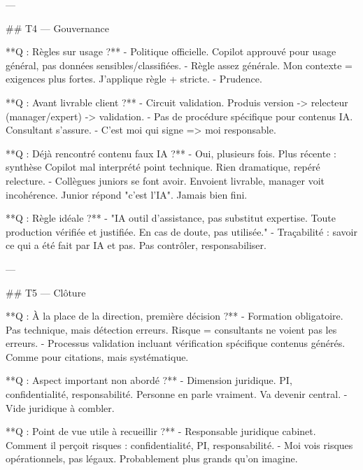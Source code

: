 ---

## T4 — Gouvernance

**Q : Règles sur usage ?**
- Politique officielle. Copilot approuvé pour usage général, pas données sensibles/classifiées.
- Règle assez générale. Mon contexte = exigences plus fortes. J'applique règle + stricte.
- Prudence.

**Q : Avant livrable client ?**
- Circuit validation. Produis version -> relecteur (manager/expert) -> validation.
- Pas de procédure spécifique pour contenus IA. Consultant s'assure.
- C'est moi qui signe => moi responsable.

**Q : Déjà rencontré contenu faux IA ?**
- Oui, plusieurs fois. Plus récente : synthèse Copilot mal interprété point technique. Rien dramatique, repéré relecture.
- Collègues juniors se font avoir. Envoient livrable, manager voit incohérence. Junior répond "c'est l'IA". Jamais bien fini.

**Q : Règle idéale ?**
- "IA outil d'assistance, pas substitut expertise. Toute production vérifiée et justifiée. En cas de doute, pas utilisée."
- Traçabilité : savoir ce qui a été fait par IA et pas. Pas contrôler, responsabiliser.

---

## T5 — Clôture

**Q : À la place de la direction, première décision ?**
- Formation obligatoire. Pas technique, mais détection erreurs. Risque = consultants ne voient pas les erreurs.
- Processus validation incluant vérification spécifique contenus générés. Comme pour citations, mais systématique.

**Q : Aspect important non abordé ?**
- Dimension juridique. PI, confidentialité, responsabilité. Personne en parle vraiment. Va devenir central.
- Vide juridique à combler.

**Q : Point de vue utile à recueillir ?**
- Responsable juridique cabinet. Comment il perçoit risques : confidentialité, PI, responsabilité.
- Moi vois risques opérationnels, pas légaux. Probablement plus grands qu'on imagine.
